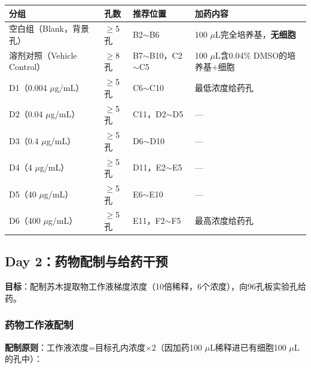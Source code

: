 \documentclass[12pt,a4paper]{article}
\newcommand{\um}{\,$\mu$g/mL}
\newcommand{\uul}{\,$\mu$L}
\begin{document}
\begin{center}
\begin{tabular}{lllp{5cm}}
\toprule
\rowcolor{tabheadbg}\color{white}\textbf{分组} & \color{white}\textbf{孔数} & \color{white}\textbf{推荐位置} & \color{white}\textbf{加药内容} \\
\midrule
空白组（Blank，背景孔） & $\geq$5孔 & B2$\sim$B6 & 100\,\uul{}完全培养基，\textbf{无细胞} \\
溶剂对照（Vehicle Control）& $\geq$8孔 & B7$\sim$B10，C2$\sim$C5 & 100\,\uul{}含0.04\% DMSO的培养基+细胞 \\
D1（0.004\,\um{}）& $\geq$5孔 & C6$\sim$C10 & 最低浓度给药孔 \\
D2（0.04\,\um{}）& $\geq$5孔 & C11，D2$\sim$D5 & — \\
D3（0.4\,\um{}）& $\geq$5孔 & D6$\sim$D10 & — \\
D4（4\,\um{}）& $\geq$5孔 & D11，E2$\sim$E5 & — \\
D5（40\,\um{}）& $\geq$5孔 & E6$\sim$E10 & — \\
D6（400\,\um{}）& $\geq$5孔 & E11，F2$\sim$F5 & 最高浓度给药孔 \\
\bottomrule
\end{tabular}
\end{center}

\subsection{Day 2：药物配制与给药干预}

\textbf{目标}：配制苏木提取物工作液梯度浓度（10倍稀释，6个浓度），向96孔板实验孔给药。

\subsubsection{药物工作液配制}

\textbf{配制原则}：工作液浓度=目标孔内浓度×2（因加药100\,\uul{}稀释进已有细胞100\,\uul{}的孔中）：
\end{document}
